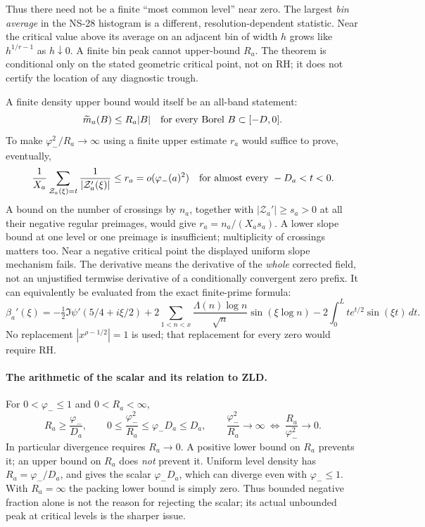 \documentclass[11pt]{article}
\theoremstyle{remark}
\begin{document}
Thus there need not be a finite ``most common level'' near zero. The
largest \emph{bin average} in the NS-28 histogram is a different,
resolution-dependent statistic. Near the critical value above its
average on an adjacent bin of width $h$ grows like $h^{1/r-1}$ as
$h\downarrow0$. A finite bin peak cannot upper-bound $R_a$. The theorem
is conditional only on the stated geometric critical point, not on RH;
it does not certify the location of any diagnostic trough.

A finite density upper bound would itself be an all-band statement:
\[
 \widetilde m_a(B)\le R_a|B|\quad\hbox{for every Borel }B\subset[-D,0].
\]
To make $\varphi_-^2/R_a\to\infty$ using a finite upper estimate $r_a$
would suffice to prove, eventually,
\begin{equation}\label{eq:v149-slope-demand}
 \frac1{X_a}\sum_{\mathcal Z_a(\xi)=t}\frac1{|\mathcal Z_a'(\xi)|}
 \le r_a=o(\varphi_-(a)^2)
 \quad\hbox{for almost every }-D_a<t<0.
\end{equation}
A bound on the number of crossings by $n_a$, together with
$|\mathcal Z_a'|\ge s_a>0$ at all their negative regular preimages,
would give $r_a=n_a/(X_as_a)$. A lower slope bound at one level or
one preimage is insufficient; multiplicity of crossings matters too.
Near a negative critical point the displayed uniform slope mechanism
fails. The derivative means the derivative of the \emph{whole} corrected
field, not an unjustified termwise derivative of a conditionally
convergent zero prefix. It can equivalently be evaluated from the exact
finite-prime formula:
\[
 \beta_a'(\xi)=-\tfrac12\Im\psi'(5/4+i\xi/2)
   +2\sum_{1<n<x}\frac{\Lambda(n)\log n}{\sqrt n}\sin(\xi\log n)
   -2\int_0^L t e^{t/2}\sin(\xi t)\,dt.
\]
No replacement $|x^{\rho-1/2}|=1$ is used; that replacement for every
zero would require RH.

\paragraph{The arithmetic of the scalar and its relation to ZLD.}
For $0<\varphi_-\le1$ and $0<R_a<\infty$,
\begin{equation}\label{eq:v149-scalar-arithmetic}
 R_a\ge\frac{\varphi_-}{D_a},\qquad
 0\le\frac{\varphi_-^2}{R_a}\le\varphi_-D_a\le D_a,
 \qquad
 \frac{\varphi_-^2}{R_a}\to\infty
 \ \Longleftrightarrow\ \frac{R_a}{\varphi_-^2}\to0.
\end{equation}
In particular divergence requires $R_a\to0$. A positive lower bound
on $R_a$ prevents it; an upper bound on $R_a$ does \emph{not} prevent
it. Uniform level density has $R_a=\varphi_-/D_a$, and gives the
scalar $\varphi_-D_a$, which can diverge even with $\varphi_-\le1$.
With $R_a=\infty$ the packing lower bound is simply zero. Thus bounded
negative fraction alone is not the reason for rejecting the scalar;
its actual unbounded peak at critical levels is the sharper issue.
\end{document}

